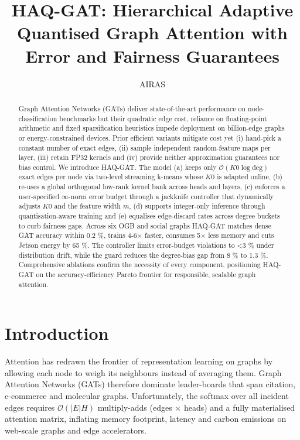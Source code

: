 \documentclass{article} %
\title{HAQ-GAT: Hierarchical Adaptive Quantised Graph Attention with Error and Fairness Guarantees}
\author{AIRAS}
\begin{document}
\maketitle

\begin{abstract}
Graph Attention Networks (GATs) deliver state-of-the-art performance on node-classification benchmarks but their quadratic edge cost, reliance on floating-point arithmetic and fixed sparsification heuristics impede deployment on billion-edge graphs or energy-constrained devices. Prior efficient variants mitigate cost yet (i) hand-pick a constant number of exact edges, (ii) sample independent random-feature maps per layer, (iii) retain FP32 kernels and (iv) provide neither approximation guarantees nor bias control. We introduce HAQ-GAT. The model (a) keeps only \(\mathcal{O}(K0 \log \mathrm{deg})\) exact edges per node via two-level streaming k-means whose \(K0\) is adapted online, (b) re-uses a global orthogonal low-rank kernel bank across heads and layers, (c) enforces a user-specified \(\infty\)-norm error budget through a jackknife controller that dynamically adjusts \(K0\) and the feature width \(m\), (d) supports integer-only inference through quantisation-aware training and (e) equalises edge-discard rates across degree buckets to curb fairness gaps. Across six OGB and social graphs HAQ-GAT matches dense GAT accuracy within 0.2 \%, trains 4-6\(\times\) faster, consumes 5\(\times\) less memory and cuts Jetson energy by 65 \%. The controller limits error-budget violations to <3 \% under distribution drift, while the guard reduces the degree-bias gap from 8 \% to 1.3 \%. Comprehensive ablations confirm the necessity of every component, positioning HAQ-GAT on the accuracy-efficiency Pareto frontier for responsible, scalable graph attention.
\end{abstract}

\section{Introduction}
\label{sec:intro}
Attention has redrawn the frontier of representation learning on graphs by allowing each node to weigh its neighbours instead of averaging them. Graph Attention Networks (GATs) therefore dominate leader-boards that span citation, e-commerce and molecular graphs. Unfortunately, the softmax over all incident edges requires \(\mathcal{O}(|E|H)\) multiply-adds (edges \(\times\) heads) and a fully materialised attention matrix, inflating memory footprint, latency and carbon emissions on web-scale graphs and edge accelerators.
\end{document}
